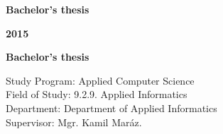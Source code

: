 \begin{center}
\centerline{\LARGE\sc\textbf\skola}
\sc\LARGE\textbf\fakulta
\end{center}

\vspace*{8cm}

\begin{center}
\begin{minipage}{0.8\textwidth}
\begin{center}
 \LARGE\sc\textbf\nazov
 \vspace{1em}
 \centerline{\Large\bf Bachelor's thesis}
\end{center}
\end{minipage}
\end{center}

\vfill
\noindent
 {\bf 2015}  \hfill {\bf \autor}
\thispagestyle{empty}



\newpage
\begin{center}
\centerline{\LARGE\sc\textbf\skola}
\sc\LARGE\textbf\fakulta
\end{center}

\vspace*{8cm}

\begin{center}
\begin{minipage}{0.8\textwidth}
\begin{center}
 \LARGE\sc\textbf\nazov 
\end{center}
\vspace{1em}
\centerline{\Large\bf Bachelor's thesis}
\end{minipage}
\end{center}

\vspace{5cm}

\linespread{1.3}%
\selectfont

\noindent
Study Program: \hspace{0.8em} Applied Computer Science\\
Field of Study: \hspace{0.8em} 9.2.9. Applied Informatics\\
Department: \hspace{0.8em} Department of Applied Informatics\\
Supervisor: \hspace{2.4em} Mgr. Kamil Maráz.



